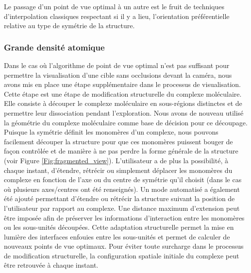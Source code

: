 Le passage d'un point de vue optimal à un autre est le fruit de techniques d'interpolation classiques respectant si il y a lieu, l'orientation préférentielle relative au type de symétrie de la structure.


\subsubsection{Grande densité atomique}


Dans le cas où l'algorithme de point de vue optimal n'est pas suffisant pour permettre la visualisation d'une cible sans occlusions devant la caméra, nous avons mis en place une étape supplémentaire dans le processus de visualisation. Cette étape est une étape de modification structurelle du complexe moléculaire. Elle consiste à découper le complexe moléculaire en sous-régions distinctes et de permettre leur dissociation pendant l'exploration. %
Nous avons de nouveau utilisé la géométrie du complexe moléculaire comme base de décision pour ce découpage. Puisque la symétrie définit les monomères d'un complexe, nous pouvons facilement découper la structure pour que ces monomères puissent bouger de façon contrôlée et de manière à ne pas perdre la forme générale de la structure (voir Figure \ref{Fig:fragmented_view}). L'utilisateur a de plus la possibilité, à chaque instant, d'étendre, rétrécir ou simplement déplacer les monomères du complexe en fonction de l'axe ou du centre de symétrie qu'il choisit (dans le cas où plusieurs axes/centres ont été renseignés). Un mode automatisé a également été ajouté permettant d'étendre ou rétrécir la structure suivant la position de l'utilisateur par rapport au complexe. Une distance maximum d'extension peut être imposée afin de préserver les informations d'interaction entre les monomères ou les sous-unités découpées. Cette adaptation structurelle permet la mise en lumière des interfaces enfouies entre les sous-unités et permet de calculer de nouveaux points de vue optimaux. Pour éviter toute surcharge dans le processus de modification structurelle, la configuration spatiale initiale du complexe peut être retrouvée à chaque instant.

